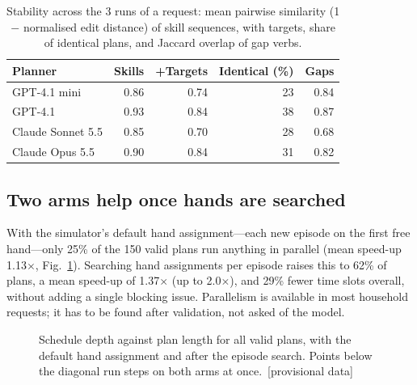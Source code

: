 \documentclass[10pt,twocolumn,letterpaper]{article}
\newif\ifprovisional \provisionaltrue
\newcommand{\provtag}{\ifprovisional\ \textcolor{prov}{[provisional data]}\fi}
\begin{document}
\begin{table}[t]
\centering\small
\caption{Stability across the 3 runs of a request: mean pairwise similarity (1 $-$ normalised edit distance) of skill
sequences, with targets, share of identical plans, and Jaccard overlap of gap verbs.}
\label{tab:stability}
\begin{tabular}{@{}lrrrr@{}}
\toprule
Planner & Skills & +Targets & Identical (\%) & Gaps\\
\midrule
GPT-4.1 mini & 0.86 & 0.74 & 23 & 0.84\\
GPT-4.1 & 0.93 & 0.84 & 38 & 0.87\\
Claude Sonnet 5.5 & 0.85 & 0.70 & 28 & 0.68\\
Claude Opus 5.5 & 0.90 & 0.84 & 31 & 0.82\\
\bottomrule
\end{tabular}
\end{table}

\subsection{Two arms help once hands are searched}
With the simulator's default hand assignment---each new episode on the first free hand---only 25\% of the 150 valid
plans run anything in parallel (mean speed-up 1.13$\times$, Fig.~\ref{fig:schedule}). Searching hand assignments per
episode raises this to 62\% of plans, a mean speed-up of 1.37$\times$ (up to 2.0$\times$), and 29\% fewer time slots
overall, without adding a single blocking issue. Parallelism is available in most household requests; it has to be
found after validation, not asked of the model.

\begin{figure}[t]
\centering
{}
\caption{Schedule depth against plan length for all valid plans, with the default hand assignment and after the
episode search. Points below the diagonal run steps on both arms at once.\provtag}
\label{fig:schedule}
\end{figure}
\end{document}
